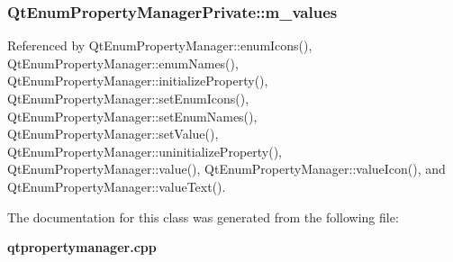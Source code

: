 \subsubsection[{m\+\_\+values}]{ Qt\+Enum\+Property\+Manager\+Private\+::m\+\_\+values}\label{classQtEnumPropertyManagerPrivate_a23fdbf3349f17ff18475bff060b03b85}


Referenced by Qt\+Enum\+Property\+Manager\+::enum\+Icons(), Qt\+Enum\+Property\+Manager\+::enum\+Names(), Qt\+Enum\+Property\+Manager\+::initialize\+Property(), Qt\+Enum\+Property\+Manager\+::set\+Enum\+Icons(), Qt\+Enum\+Property\+Manager\+::set\+Enum\+Names(), Qt\+Enum\+Property\+Manager\+::set\+Value(), Qt\+Enum\+Property\+Manager\+::uninitialize\+Property(), Qt\+Enum\+Property\+Manager\+::value(), Qt\+Enum\+Property\+Manager\+::value\+Icon(), and Qt\+Enum\+Property\+Manager\+::value\+Text().



The documentation for this class was generated from the following file\+:\begin{DoxyCompactItemize}
\item 
{\bf qtpropertymanager.\+cpp}\end{DoxyCompactItemize}
